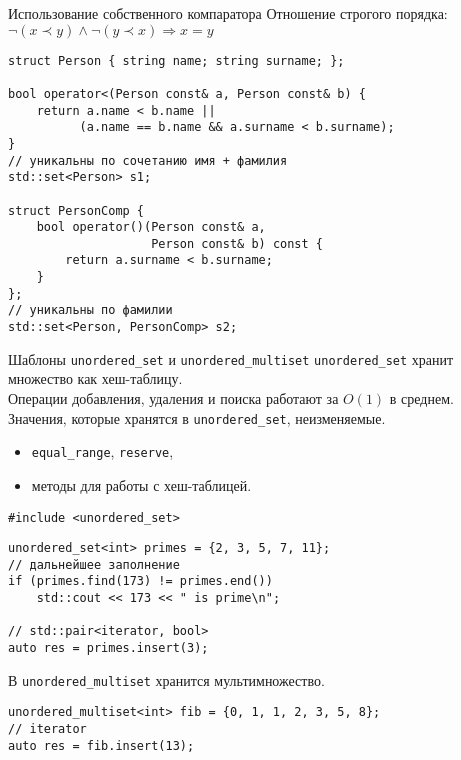 \documentclass[aspectration=1610,t]{beamer}
\begin{document}
\begin{frame}[fragile]{Использование собственного компаратора}
Отношение строгого порядка:
$\neg (x \prec y) \land \neg(y \prec x) \Rightarrow x = y$

\begin{lstlisting}
struct Person { string name; string surname; };

bool operator<(Person const& a, Person const& b) {
    return a.name < b.name || 
          (a.name == b.name && a.surname < b.surname);
}
// уникальны по сочетанию имя + фамилия
std::set<Person> s1;

struct PersonComp {
    bool operator()(Person const& a, 
                    Person const& b) const {
        return a.surname < b.surname;
    }
};
// уникальны по фамилии
std::set<Person, PersonComp> s2;
\end{lstlisting}
\end{frame}


\begin{frame}[fragile]{Шаблоны {\tt unordered\_set} и {\tt unordered\_multiset}}
\texttt{unordered\_set} хранит множество как хеш-таблицу.\\ 
Операции добавления, удаления и поиска работают за $O(1)$ в среднем.
Значения, которые хранятся в \texttt{unordered\_set}, неизменяемые.
\begin{itemize}
	\item {\tt equal\_range}, {\tt reserve},
	\item методы для работы с хеш-таблицей.
\end{itemize}\vspace{-1mm}

\begin{lstlisting}
#include <unordered_set>
\end{lstlisting}\vspace{-2mm}

\begin{lstlisting}
unordered_set<int> primes = {2, 3, 5, 7, 11};
// дальнейшее заполнение
if (primes.find(173) != primes.end())
    std::cout << 173 << " is prime\n";
    
// std::pair<iterator, bool>
auto res = primes.insert(3);
\end{lstlisting}
В \texttt{unordered\_multiset} хранится мультимножество.
\vspace{-1mm}
\begin{lstlisting}
unordered_multiset<int> fib = {0, 1, 1, 2, 3, 5, 8};
// iterator
auto res = fib.insert(13);
\end{lstlisting}
\end{frame}
\end{document}
